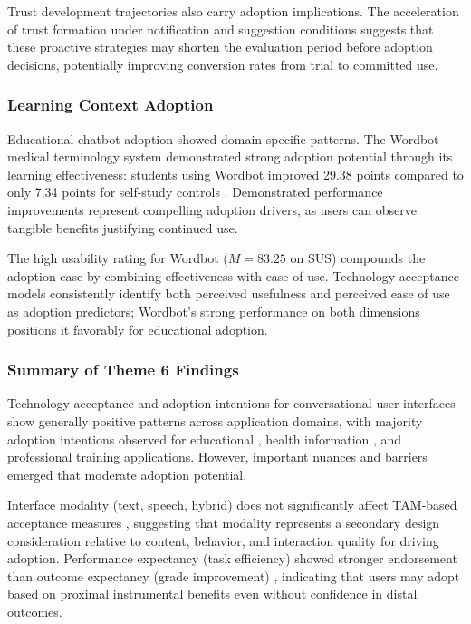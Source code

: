 \documentclass[manuscript,anonymous,sigconf]{acmart}
\begin{document}
Trust development trajectories also carry adoption implications. The acceleration of trust formation under notification and suggestion conditions \cite{A16} suggests that these proactive strategies may shorten the evaluation period before adoption decisions, potentially improving conversion rates from trial to committed use.

\subsubsection{Learning Context Adoption}

Educational chatbot adoption showed domain-specific patterns. The Wordbot medical terminology system demonstrated strong adoption potential through its learning effectiveness: students using Wordbot improved 29.38 points compared to only 7.34 points for self-study controls \cite{A34}. Demonstrated performance improvements represent compelling adoption drivers, as users can observe tangible benefits justifying continued use.

The high usability rating for Wordbot ($M = 83.25$ on SUS) \cite{A34} compounds the adoption case by combining effectiveness with ease of use. Technology acceptance models consistently identify both perceived usefulness and perceived ease of use as adoption predictors; Wordbot's strong performance on both dimensions positions it favorably for educational adoption.

\subsubsection{Summary of Theme 6 Findings}

Technology acceptance and adoption intentions for conversational user interfaces show generally positive patterns across application domains, with majority adoption intentions observed for educational \cite{A22}, health information \cite{A79}, and professional training \cite{A54} applications. However, important nuances and barriers emerged that moderate adoption potential.

Interface modality (text, speech, hybrid) does not significantly affect TAM-based acceptance measures \cite{A15}, suggesting that modality represents a secondary design consideration relative to content, behavior, and interaction quality for driving adoption. Performance expectancy (task efficiency) showed stronger endorsement than outcome expectancy (grade improvement) \cite{A22}, indicating that users may adopt based on proximal instrumental benefits even without confidence in distal outcomes.
\end{document}
